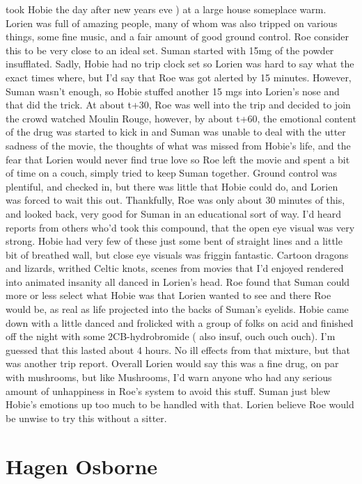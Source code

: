 \documentclass[12pt]{book}
\begin{document}
took Hobie the day after new years eve ) at a large house someplace warm. Lorien was full of amazing people, many of whom was also tripped on various things, some fine music, and a fair amount of good ground control. Roe consider this to be very close to an ideal set. Suman started with 15mg of the powder insufflated. Sadly, Hobie had no trip clock set so Lorien was hard to say what the exact times where, but I'd say that Roe was got alerted by 15 minutes. However, Suman wasn't enough, so Hobie stuffed another 15 mgs into Lorien's nose and that did the trick. At about t+30, Roe was well into the trip and decided to join the crowd watched Moulin Rouge, however, by about t+60, the emotional content of the drug was started to kick in and Suman was unable to deal with the utter sadness of the movie, the thoughts of what was missed from Hobie's life, and the fear that Lorien would never find true love so Roe left the movie and spent a bit of time on a couch, simply tried to keep Suman together. Ground control was plentiful, and checked in, but there was little that Hobie could do, and Lorien was forced to wait this out. Thankfully, Roe was only about 30 minutes of this, and looked back, very good for Suman in an educational sort of way. I'd heard reports from others who'd took this compound, that the open eye visual was very strong. Hobie had very few of these just some bent of straight lines and a little bit of breathed wall, but close eye visuals was friggin fantastic. Cartoon dragons and lizards, writhed Celtic knots, scenes from movies that I'd enjoyed rendered into animated insanity all danced in Lorien's head. Roe found that Suman could more or less select what Hobie was that Lorien wanted to see and there Roe would be, as real as life projected into the backs of Suman's eyelids. Hobie came down with a little danced and frolicked with a group of folks on acid and finished off the night with some 2CB-hydrobromide ( also insuf, ouch ouch ouch). I'm guessed that this lasted about 4 hours. No ill effects from that mixture, but that was another trip report. Overall Lorien would say this was a fine drug, on par with mushrooms, but like Mushrooms, I'd warn anyone who had any serious amount of unhappiness in Roe's system to avoid this stuff. Suman just blew Hobie's emotions up too much to be handled with that. Lorien believe Roe would be unwise to try this without a sitter.



\chapter{Hagen Osborne}
\end{document}
